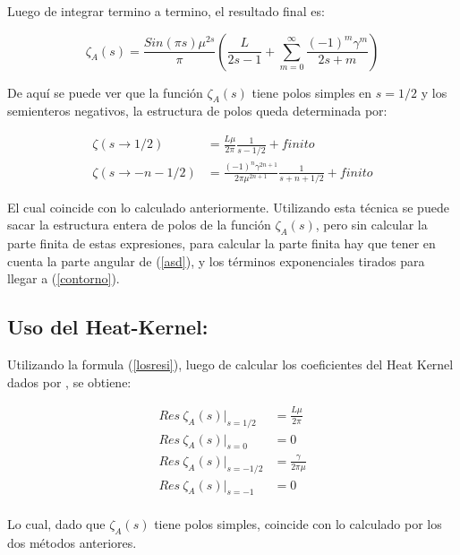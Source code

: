 Luego de integrar termino a termino, el resultado final es:

\begin{equation}
    \zeta _A (s) = 
    \frac{Sin(\pi s) \mu ^{2s }}{\pi } 
    \left(
    \frac{L}{2s-1} + 
    \sum _{m=0} ^{\infty}
    \frac{(-1) ^{m} \gamma ^{m} }{2s+m}
    \right)
\label{eq.zeta.com}
\end{equation}

De aquí se puede ver que la función $\zeta _A (s)$ tiene polos simples en $s=1/2$ y los semienteros negativos, la estructura de polos queda determinada por:

\begin{equation}
\begin{aligned}
\zeta(s \rightarrow 1/2) &= \frac{L \mu }{2 \pi} \frac{1}{s-1/2} + finito \\
\zeta (s \rightarrow -n - 1/2)  &= \frac{ (-1) ^n \gamma ^{2n+1}  }{2 \pi \mu ^{2n + 1}} \frac{1}{s + n + 1/2} + finito
\end{aligned}
\end{equation}


El cual coincide con lo calculado anteriormente. Utilizando esta técnica se puede sacar la estructura entera de polos de la función $\zeta _A (s) $, pero sin calcular la parte finita de estas expresiones, para calcular la parte finita hay que tener en cuenta la parte angular de (\ref{asd}), y los términos exponenciales tirados para llegar a (\ref{contorno}).


\subsection{Uso del Heat-Kernel:}


Utilizando la formula (\ref{losresi}), luego de calcular los coeficientes del Heat Kernel dados por \cite{VASSILEVICH2003279}, se obtiene:



\begin{equation}
\begin{aligned}
Res \  \zeta _A (s)  | _{s=1/2} &= \frac{L \mu}{2 \pi} \\[5pt]
Res \  \zeta _A (s)  | _{s=0} &= 0 \\[5pt]
Res \ \zeta _A (s) | _{s=-1/2} &= \frac{\gamma}{2 \pi \mu} \\[5pt]
Res \  \zeta _A (s) | _{s=-1} &= 0 \\[5pt]
\end{aligned}
\end{equation}


Lo cual, dado que $\zeta _A (s)$ tiene polos simples, coincide con lo calculado por los dos métodos anteriores.
